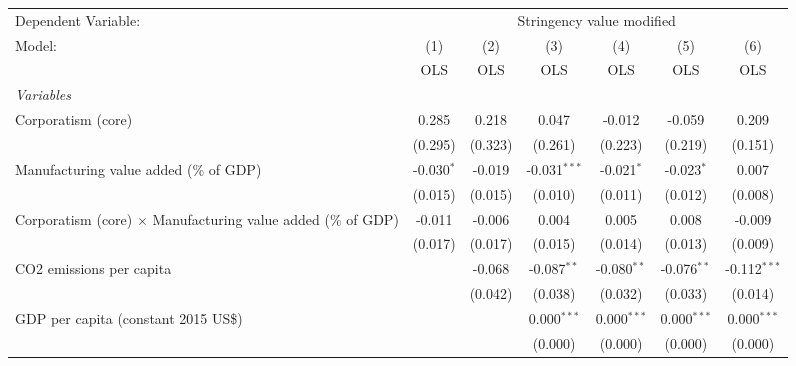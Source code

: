 
\begingroup
\centering
\begin{tabular}{lcccccc}
   \toprule
   Dependent Variable: & \multicolumn{6}{c}{Stringency value modified}\\
   Model:                                                              & (1)          & (2)     & (3)            & (4)           & (5)           & (6)\\  
                                                                       &  OLS         & OLS     & OLS            & OLS           & OLS           & OLS\\  
   \midrule
   \emph{Variables}\\
   Corporatism (core)                                                  & 0.285        & 0.218   & 0.047          & -0.012        & -0.059        & 0.209\\   
                                                                       & (0.295)      & (0.323) & (0.261)        & (0.223)       & (0.219)       & (0.151)\\   
   Manufacturing value added (\% of GDP)                               & -0.030$^{*}$ & -0.019  & -0.031$^{***}$ & -0.021$^{*}$  & -0.023$^{*}$  & 0.007\\   
                                                                       & (0.015)      & (0.015) & (0.010)        & (0.011)       & (0.012)       & (0.008)\\   
   Corporatism (core) $\times$ Manufacturing value added (\% of GDP)   & -0.011       & -0.006  & 0.004          & 0.005         & 0.008         & -0.009\\   
                                                                       & (0.017)      & (0.017) & (0.015)        & (0.014)       & (0.013)       & (0.009)\\   
   CO2 emissions per capita                                            &              & -0.068  & -0.087$^{**}$  & -0.080$^{**}$ & -0.076$^{**}$ & -0.112$^{***}$\\   
                                                                       &              & (0.042) & (0.038)        & (0.032)       & (0.033)       & (0.014)\\   
   GDP per capita (constant 2015 US\$)                                 &              &         & 0.000$^{***}$  & 0.000$^{***}$ & 0.000$^{***}$ & 0.000$^{***}$\\   
                                                                       &              &         & (0.000)        & (0.000)       & (0.000)       & (0.000)\\   

\end{tabular}
